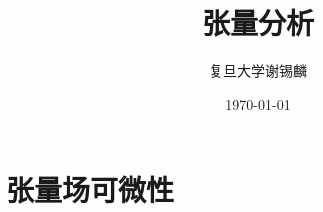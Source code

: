 \documentclass[oneside]{book}
\title{
	\vspace{-4 cm} \color{Sienna} \Huge 张量分析
}
\author{
	\CJKfamily{楷体} \color{DarkRed} \Large
	复旦大学\phantom{空格}谢锡麟
}
\date{
	\CJKfamily{楷体} \color{Goldenrod} \Large \today
}
\theoremstyle{nonumberplain} %
\begin{document}
%	
%	
%		
%	
%		
%	
%		
%	
	\chapter{张量场可微性}
		
%		
\end{document}
